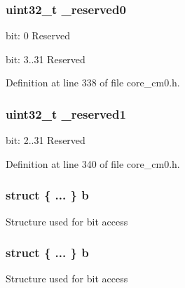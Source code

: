 \subsubsection[{\texorpdfstring{\+\_\+reserved0}{_reserved0}}]{\setlength{\rightskip}{0pt plus 5cm}uint32\+\_\+t \+\_\+reserved0}\hypertarget{union_c_o_n_t_r_o_l___type_ac8a6a13838a897c8d0b8bc991bbaf7c1}{}\label{union_c_o_n_t_r_o_l___type_ac8a6a13838a897c8d0b8bc991bbaf7c1}
bit\+: 0 Reserved

bit\+: 3..31 Reserved 

Definition at line 338 of file core\+\_\+cm0.\+h.

\subsubsection[{\texorpdfstring{\+\_\+reserved1}{_reserved1}}]{\setlength{\rightskip}{0pt plus 5cm}uint32\+\_\+t \+\_\+reserved1}\hypertarget{union_c_o_n_t_r_o_l___type_a959a73d8faee56599b7e792a7c5a2d16}{}\label{union_c_o_n_t_r_o_l___type_a959a73d8faee56599b7e792a7c5a2d16}
bit\+: 2..31 Reserved 

Definition at line 340 of file core\+\_\+cm0.\+h.

\subsubsection[{\texorpdfstring{b}{b}}]{\setlength{\rightskip}{0pt plus 5cm}struct \{ ... \}   b}\hypertarget{union_c_o_n_t_r_o_l___type_ab2a41711c248a319c2e7d0ab73c3a8b9}{}\label{union_c_o_n_t_r_o_l___type_ab2a41711c248a319c2e7d0ab73c3a8b9}
Structure used for bit access 
\subsubsection[{\texorpdfstring{b}{b}}]{\setlength{\rightskip}{0pt plus 5cm}struct \{ ... \}   b}\hypertarget{union_c_o_n_t_r_o_l___type_a1aaf2022b762ebb6bdec99768b905056}{}\label{union_c_o_n_t_r_o_l___type_a1aaf2022b762ebb6bdec99768b905056}
Structure used for bit access 
